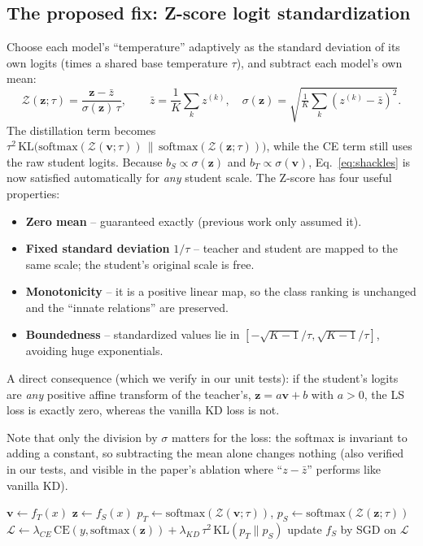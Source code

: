\documentclass[12pt,a4paper]{article}
\begin{document}
\subsection{The proposed fix: Z-score logit standardization}
Choose each model's ``temperature'' adaptively as the standard deviation of its own logits (times a shared base temperature $\tau$), and subtract each model's own mean:
\begin{equation}
\mathcal{Z}(\mathbf{z};\tau)=\frac{\mathbf{z}-\bar{z}}{\sigma(\mathbf{z})\,\tau},\qquad
\bar z=\frac1K\sum_k z^{(k)},\quad
\sigma(\mathbf{z})=\sqrt{\tfrac1K\textstyle\sum_k (z^{(k)}-\bar z)^2}.
\label{eq:zscore}
\end{equation}
The distillation term becomes $\tau^2\,\mathrm{KL}\big(\mathrm{softmax}(\mathcal{Z}(\mathbf{v};\tau))\,\|\,\mathrm{softmax}(\mathcal{Z}(\mathbf{z};\tau))\big)$, while the CE term still uses the raw student logits. Because $b_S\propto\sigma(\mathbf{z})$ and $b_T\propto\sigma(\mathbf{v})$, Eq.~\eqref{eq:shackles} is now satisfied automatically for \emph{any} student scale. The Z-score has four useful properties:
\begin{itemize}[nosep]
\item \textbf{Zero mean} -- guaranteed exactly (previous work only assumed it).
\item \textbf{Fixed standard deviation} $1/\tau$ -- teacher and student are mapped to the same scale; the student's original scale is free.
\item \textbf{Monotonicity} -- it is a positive linear map, so the class ranking is unchanged and the ``innate relations'' are preserved.
\item \textbf{Boundedness} -- standardized values lie in $[-\sqrt{K-1}/\tau,\sqrt{K-1}/\tau]$, avoiding huge exponentials.
\end{itemize}
A direct consequence (which we verify in our unit tests): if the student's logits are \emph{any} positive affine transform of the teacher's, $\mathbf{z}=a\mathbf{v}+b$ with $a>0$, the LS loss is exactly zero, whereas the vanilla KD loss is not.

Note that only the division by $\sigma$ matters for the loss: the softmax is invariant to adding a constant, so subtracting the mean alone changes nothing (also verified in our tests, and visible in the paper's ablation where ``$z-\bar z$'' performs like vanilla KD).

\begin{algorithm}[H]
\caption{KD with logit standardization (paper Algorithm 2, as implemented in \texttt{lskd/losses.py})}
\begin{algorithmic}[1]
  \State $\mathbf{v}\gets f_T(x)$ 
  \State $\mathbf{z}\gets f_S(x)$
  \State $p_T\gets\mathrm{softmax}(\mathcal{Z}(\mathbf{v};\tau))$, \quad $p_S\gets\mathrm{softmax}(\mathcal{Z}(\mathbf{z};\tau))$
  \State $\mathcal{L}\gets\lambda_{CE}\,\mathrm{CE}(y,\mathrm{softmax}(\mathbf{z}))+\lambda_{KD}\,\tau^2\,\mathrm{KL}(p_T\|p_S)$
  \State update $f_S$ by SGD on $\mathcal{L}$
\EndFor
\end{algorithmic}
\end{algorithm}
\end{document}
